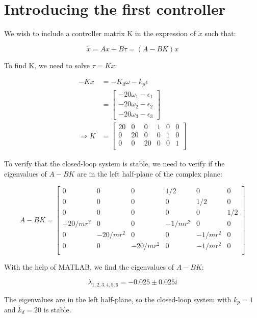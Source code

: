\section{Introducing the first controller}

We wish to include a controller matrix K in the expression of $\dot{x}$ such that:

\begin{equation*}
    \dot{x} = Ax + B\tau = (A - BK) x
\end{equation*}

To find K, we need to solve $\tau = Kx$:

\begin{equations}
    \begin{align*}
        -Kx &= -K_d\omega -k_p\epsilon\\
        &=
        \begin{bmatrix}
            -20\omega_1 -\epsilon_1\\
            -20\omega_2 -\epsilon_2\\
            -20\omega_3 -\epsilon_3
        \end{bmatrix}\\
        \Rightarrow K &=
        \begin{bmatrix}
            20  &   0   &   0   &   1   &   0   &   0\\
            0   &   20  &   0   &   0   &   1   &   0\\
            0   &   0   &   20  &   0   &   0   &   1\\
        \end{bmatrix}
    \end{align*}
\end{equations}

To verify that the closed-loop system is stable, we need to verify if the eigenvalues of $A-BK$ are in the left half-plane of the complex plane:

\begin{equation*}
    A-BK =
    \begin{bmatrix}
        0           &   0           &   0           &   1/2         &   0           &   0  \\
        0           &   0           &   0           &   0           &   1/2         &   0  \\
        0           &   0           &   0           &   0           &   0           &   1/2\\
        -20/mr^2  &   0           &   0           &   -1/mr^2   &   0           &   0  \\
        0           &   -20/mr^2  &   0           &   0           &   -1/mr^2   &   0  \\
        0           &   0           &   -20/mr^2  &   0           &   -1/mr^2   &   0  \\
    \end{bmatrix}
\end{equation*}

With the help of MATLAB, we find the eigenvalues of $A-BK$:

\begin{equation*}
    \lambda_{1,2,3,4,5,6} = -0.025 \pm 0.025i
\end{equation*}

The eigenvalues are in the left half-plane, so the closed-loop system with $k_p = 1$ and $k_d = 20$ is stable.
